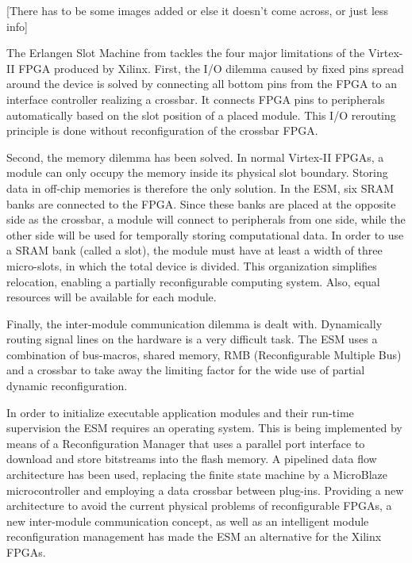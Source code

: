 
[There has to be some images added or else it doesn't come across, or just less info] 

The Erlangen Slot Machine from \cite{erlangen} tackles the four major limitations of the Virtex-II FPGA produced by Xilinx. First, the I/O dilemma caused by fixed pins spread around the device is solved by connecting all bottom pins from the FPGA to an interface controller realizing a crossbar. It connects FPGA pins to peripherals automatically based on the slot position of a placed module. This I/O rerouting principle is done without reconfiguration of the crossbar FPGA.

Second, the memory dilemma has been solved. In normal Virtex-II FPGAs, a module can only occupy the memory inside its physical slot boundary. Storing data in off-chip memories is therefore the only solution. In the ESM, six SRAM banks are connected to the FPGA. Since these banks are placed at the opposite side as the crossbar, a module will connect to peripherals from one side, while the other side will be used for temporally storing computational data. In order to use a SRAM bank (called a slot), the module must have at least a width of three micro-slots, in which the total device is divided. This organization simplifies relocation, enabling a partially reconfigurable computing system. Also, equal resources will be available for each module.

Finally, the inter-module communication dilemma is dealt with. Dynamically routing signal lines on the hardware is a very difficult task. The ESM uses a combination of bus-macros, shared memory, RMB (Reconfigurable Multiple Bus) and a crossbar to take away the limiting factor for the wide use of partial dynamic reconfiguration.

In order to initialize executable application modules and their run-time supervision the ESM requires an operating system. This is being implemented by means of a Reconfiguration Manager that uses a parallel port interface to download and store bitstreams into the flash memory. A pipelined data flow architecture has been used, replacing the finite state machine by a MicroBlaze microcontroller and employing a data crossbar between plug-ins. Providing  a new architecture to avoid the current physical problems of reconfigurable FPGAs, a new inter-module communication concept, as well as an intelligent module reconfiguration management has made the ESM an alternative for the Xilinx FPGAs.
